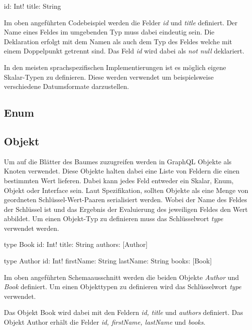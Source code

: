 \begin{JsCode}
    id: Int!
    title: String
\end{JsCode}

Im oben angeführten Codebeispiel werden die Felder \textit{id} und \textit{title} definiert.
Der Name eines Feldes im umgebenden Typ muss dabei eindeutig sein.
Die Deklaration erfolgt mit dem Namen als auch dem Typ des Feldes welche mit einem Doppelpunkt getrennt sind.
Das Feld \textit{id} wird dabei als \textit{not null} deklariert.



In den meisten sprachspezifischen Implementierungen ist es möglich eigene Skalar-Typen zu definieren. Diese werden verwendet um beispielsweise verschiedene Datumsformate darzustellen.

\subsection{Enum}

\subsection{Objekt}
Um auf die Blätter des Baumes zuzugreifen werden in GraphQL Objekte als Knoten verwendet.
Diese Objekte halten dabei eine Liste von Feldern die einen bestimmten Wert lieferen.
Dabei kann jedes Feld entweder ein Skalar, Enum, Objekt oder Interface sein.
Laut Spezifikation, sollten Objekte als eine Menge von geordneten Schlüssel-Wert-Paaren serialisiert werden.
Wobei der Name des Feldes der Schlüssel ist und das Ergebnis der Evaluierung des jeweiligen Feldes den Wert abbildet.
Um einen Objekt-Typ zu definieren muss das Schlüsselwort \textit{type} verwendet werden.

\begin{JsCode}
type Book {
    id: Int!
    title: String
    authors: [Author]
}
    
type Author {
    id: Int!
    firstName: String
    lastName: String
    books: [Book]
}
\end{JsCode}

Im oben angeführten Schemaausschnitt werden die beiden Objekte \textit{Author} und \textit{Book} definiert.
Um einen Objekttypen zu definieren wird das Schlüsselwort \textit{type} verwendet.

Das Objekt Book wird dabei mit den Feldern \textit{id, title} und \textit{authors} definiert.
Das Objekt Author erhält die Felder \textit{id, firstName, lastName} und \textit{books}.

